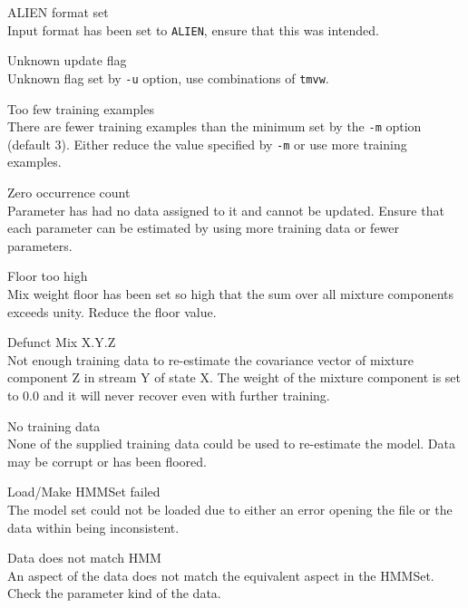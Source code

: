 \begin{itemize}
\begin{itemize}
    ALIEN format set\\
        Input format has been set to \texttt{ALIEN}, ensure that this was 
        intended.

\end{itemize}


\begin{itemize}
    Unknown update flag\\
        Unknown flag set by \texttt{-u} option, use combinations of 
        \texttt{tmvw}.

    Too few training examples\\
        There are fewer training examples than the minimum set by the 
        \texttt{-m} option (default 3).  Either reduce the value specified
        by \texttt{-m} or use more training examples.

    Zero occurrence count\\
        Parameter has had no data assigned to it and cannot be
        updated.  Ensure that each parameter can be estimated by
        using more training data or fewer parameters.

    Floor too high\\
        Mix weight floor has been set so high that the sum over all 
        mixture components exceeds unity.  Reduce the floor value.

    Defunct Mix X.Y.Z \\
        Not enough training data to re-estimate the covariance vector of
        mixture component Z in stream Y of state X. The weight of the mixture
        component is set to 0.0 and it will never recover even with further
        training.

    No training data\\
        None of the supplied training data could be used to
        re-estimate the model. Data may be corrupt or has been floored.

    Load/Make HMMSet failed\\
        The model set could not be loaded due to either an error opening the
        file or the data within being inconsistent.

    Data does not match HMM\\
        An aspect of the data does not match the equivalent aspect in 
        the HMMSet.  Check the parameter kind of the data.


\end{itemize}
\end{itemize}
